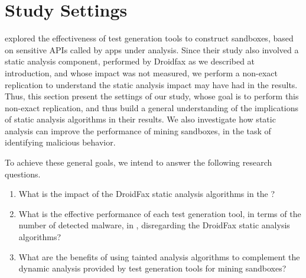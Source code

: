 \section{Study Settings}


\blls explored the effectiveness of test generation tools to construct sandboxes, based on sensitive APIs called by apps under analysis. Since their study also involved a static analysis component, performed by Droidfax as we described at introduction, and whose impact was not measured, we perform a non-exact replication to understand the static analysis impact may have had in the results. Thus, this section present the settings of our study, whose goal is to perform this non-exact replication, and thus build a general understanding of the implications of static analysis algorithms in their results. We also investigate how static analysis can improve the performance of mining sandboxes, in the task of identifying malicious behavior.

To achieve these general goals, we intend to answer the following research questions.

\begin{enumerate}[(RQ1)]
 
 \item What is the impact of the DroidFax static analysis algorithms in the \blls?
  
 \item What is the effective performance of each test generation tool, in terms of the number of detected malware, in \blls, disregarding the DroidFax
  static analysis algorithms?

 \item What are the benefits of using tainted analysis algorithms to complement the dynamic analysis provided by test generation tools for mining sandboxes?
\end{enumerate}


